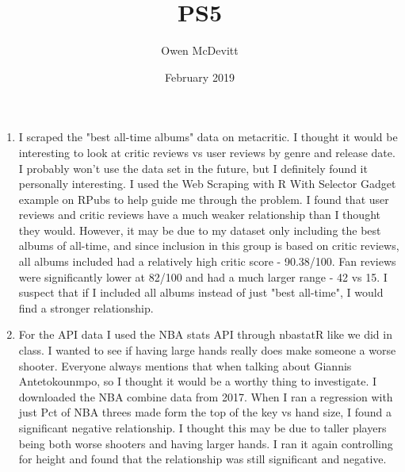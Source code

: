 \documentclass{article}
\title{PS5}
\author{Owen McDevitt}
\date{February 2019}
\begin{document}
\maketitle

\begin{enumerate}
    \item I scraped the "best all-time albums" data on metacritic. I thought it would be interesting to look at critic reviews vs user reviews by genre and release date. I probably won't use the data set in the future, but I definitely found it personally interesting. I used the Web Scraping with R With Selector Gadget example on RPubs to help guide me through the problem. I found that user reviews and critic reviews have a much weaker relationship than I thought they would. However, it may be due to my dataset only including the best albums of all-time, and since inclusion in this group is based on critic reviews, all albums included had a relatively high critic score - 90.38/100. Fan reviews were significantly lower at 82/100 and had a much larger range - 42 vs 15. I suspect that if I included all albums instead of just "best all-time", I would find a stronger relationship.
    \item For the API data I used the NBA stats API through nbastatR like we did in class. I wanted to see if having large hands really does make someone a worse shooter. Everyone always mentions that when talking about Giannis Antetokounmpo, so I thought it would be a worthy thing to investigate. I downloaded the NBA combine data from 2017. When I ran a regression with just Pct of NBA threes made form the top of the key vs hand size, I found a significant negative relationship. I thought this may be due to taller players being both worse shooters and having larger hands. I ran it again controlling for height and found that the relationship was still significant and negative.
\end{enumerate}
\end{document}
